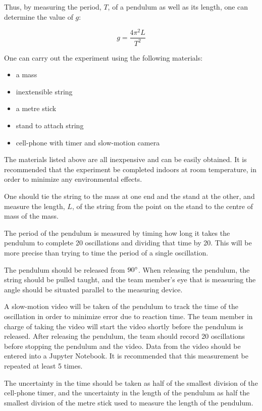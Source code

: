 Thus, by measuring the period, $T$, of a pendulum as well as its length, one can determine the value of $g$:

\begin{equation}
g=\frac{4\pi^{2}L}{T^{2}}
\end{equation}

One can carry out the experiment using the following materials:

\begin{itemize}
\item a mass
\item inextensible string
\item a metre stick
\item stand to attach string
\item cell-phone with timer and slow-motion camera
\end{itemize}

The materials listed above are all inexpensive and can be easily obtained.  It is recommended that the experiment be completed indoors at room temperature, in order to minimize any environmental effects.

One should tie the string to the mass at one end and the stand at the other, and measure the length, $L$, of the string from the point on the stand to the centre of mass of the mass.

The period of the pendulum is measured by timing how long it takes the pendulum to complete 20 oscillations and dividing that time by 20. This will be more precise than trying to time the period of a single oscillation.

The pendulum should be released from $90\degree$. When releasing the pendulum, the string should be pulled taught, and the team member's eye that is measuring the angle should be situated parallel to the measuring device.

A slow-motion video will be taken of the pendulum to track the time of the oscillation in order to minimize error due to reaction time. The team member in charge of taking the video will start the video shortly before the pendulum is released. After releasing the pendulum, the team should record 20 oscillations before stopping the pendulum and the video. Data from the video should be entered into a Jupyter Notebook. It is recommended that this measurement be repeated at least 5 times.

The uncertainty in the time should be taken as half of the smallest division of the cell-phone timer, and the uncertainty in the length of the pendulum as half the smallest division of the metre stick used to measure the length of the pendulum.


